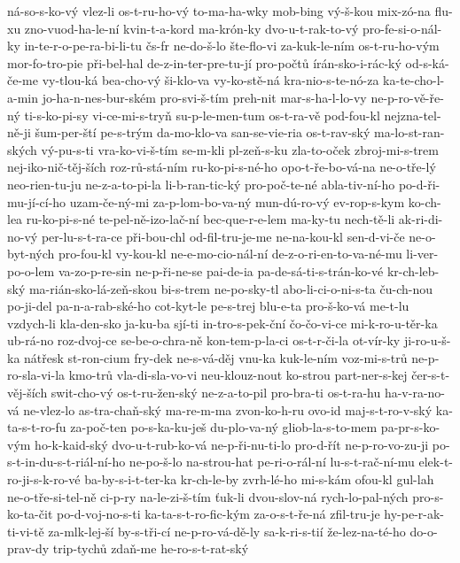 ná-so-s-ko-vý
vlez-li
os-t-ru-ho-vý
to-ma-ha-wky
mob-bing
vý-š-kou
mix-zó-na
flu-xu
zno-vuod-ha-le-ní
kvin-t-a-kord
ma-krón-ky
dvo-u-t-rak-to-vý
pro-fe-si-o-nál-ky
in-te-r-o-pe-ra-bi-li-tu
čs-fr
ne-do-š-lo
šte-flo-vi
za-kuk-le-ním
os-t-ru-ho-vým
mor-fo-tro-pie
při-bel-hal
de-z-in-ter-pre-tu-jí
pro-počtů
írán-sko-i-rác-ký
od-s-ká-če-me
vy-tlou-ká
bea-cho-vý
ši-klo-va
vy-ko-stě-ná
kra-nio-s-te-nó-za
ka-te-cho-l-a-min
jo-ha-n-nes-bur-ském
pro-svi-š-tím
preh-nit
mar-s-ha-l-lo-vy
ne-p-ro-vě-ře-ný
ti-s-ko-pi-sy
vi-ce-mi-s-tryň
su-p-le-men-tum
os-t-ra-vě
pod-fou-kl
nejzna-tel-ně-ji
šum-per-ští
pe-s-trým
da-mo-klo-va
san-se-vie-ria
os-t-rav-ský
ma-lo-st-ran-ských
vý-pu-s-ti
vra-ko-vi-š-tím
se-m-kli
pl-zeň-s-ku
zla-to-oček
zbroj-mi-s-trem
nej-iko-nič-těj-ších
roz-rů-stá-ním
ru-ko-pi-s-né-ho
opo-t-ře-bo-vá-na
ne-o-tře-lý
neo-rien-tu-ju
ne-z-a-to-pi-la
li-b-ran-tic-ký
pro-poč-te-né
abla-tiv-ní-ho
po-d-ři-mu-jí-cí-ho
uzam-če-ný-mi
za-p-lom-bo-va-ný
mun-dú-ro-vý
ev-rop-s-kym
ko-ch-lea
ru-ko-pi-s-né
te-pel-ně-izo-lač-ní
bec-que-r-e-lem
ma-ky-tu
nech-tě-li
ak-ri-di-no-vý
per-lu-s-t-ra-ce
při-bou-chl
od-fil-tru-je-me
ne-na-kou-kl
sen-d-vi-če
ne-o-byt-ných
pro-fou-kl
vy-kou-kl
ne-e-mo-cio-nál-ní
de-z-o-ri-en-to-va-né-mu
li-ver-po-o-lem
va-zo-p-re-sin
ne-p-ři-ne-se
pai-de-ia
pa-de-sá-ti-s-trán-ko-vé
kr-ch-leb-ský
ma-rián-sko-lá-zeň-skou
bi-s-trem
ne-po-sky-tl
abo-li-ci-o-ni-s-ta
ču-ch-nou
po-ji-del
pa-n-a-rab-ské-ho
cot-kyt-le
pe-s-trej
blu-e-ta
pro-š-ko-vá
me-t-lu
vzdych-li
kla-den-sko
ja-ku-ba
sjí-ti
in-tro-s-pek-ční
čo-čo-vi-ce
mi-k-ro-u-těr-ka
ub-rá-no
roz-dvoj-ce
se-be-o-chra-ně
kon-tem-p-la-ci
os-t-r-či-la
ot-vír-ky
ji-ro-u-š-ka
nátřesk
st-ron-cium
fry-dek
ne-s-vá-děj
vnu-ka
kuk-le-ním
voz-mi-s-trů
ne-p-ro-sla-vi-la
kmo-trů
vla-di-sla-vo-vi
neu-klouz-nout
ko-strou
part-ner-s-kej
čer-s-t-věj-ších
swit-cho-vý
os-t-ru-žen-ský
ne-z-a-to-pil
pro-bra-ti
os-t-ra-hu
ha-v-ra-no-vá
ne-vlez-lo
as-tra-chaň-ský
ma-re-m-ma
zvon-ko-h-ru
ovo-id
maj-s-t-ro-v-ský
ka-ta-s-t-ro-fu
za-poč-ten
po-s-ka-ku-ješ
du-plo-va-ný
gliob-la-s-to-mem
pa-pr-s-ko-vým
ho-k-kaid-ský
dvo-u-t-rub-ko-vá
ne-p-ři-nu-ti-lo
pro-d-řít
ne-p-ro-vo-zu-ji
po-s-t-in-du-s-t-riál-ní-ho
ne-po-š-lo
na-strou-hat
pe-ri-o-rál-ní
lu-s-t-rač-ní-mu
elek-t-ro-ji-s-k-ro-vé
ba-by-s-i-t-ter-ka
kr-ch-le-by
zvrh-lé-ho
mi-s-kám
ofou-kl
gul-lah
ne-o-tře-si-tel-ně
ci-p-ry
na-le-zi-š-tím
ťuk-li
dvou-slov-ná
rych-lo-pal-ných
pro-s-ko-ta-čit
po-d-voj-no-s-ti
ka-ta-s-t-ro-fic-kým
za-o-s-t-ře-ná
zfil-tru-je
hy-pe-r-ak-ti-vi-tě
za-mlk-lej-ší
by-s-tři-cí
ne-p-ro-vá-dě-ly
sa-k-ri-s-tií
že-lez-na-té-ho
do-o-prav-dy
trip-tychů
zdaň-me
he-ro-s-t-rat-ský
